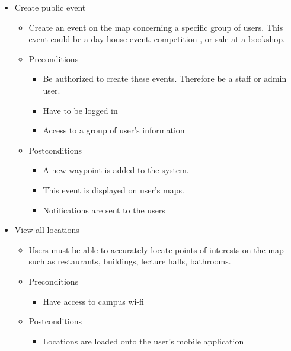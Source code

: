 \documentclass[12pt]{article}
\begin{document}
\begin{enumerate}
\begin{itemize}
				\item Create public event
				\begin{itemize}
					\item Create an event on the map concerning a specific group of users. This event could be a day house event. competition , or sale at a bookshop.
					\item Preconditions
					\begin{itemize}
						\item Be authorized to create these events. Therefore be a staff or admin user.
						\item Have to be logged in
						\item Access to a group of user’s information
					\end{itemize}
					\item Postconditions
					\begin{itemize}
						\item A new waypoint is added to the system.
						\item This event is displayed on user’s maps.
						\item Notifications are sent to the users
					\end{itemize}
				\end{itemize}
				
				\item View all locations
				\begin{itemize}
					\item Users must be able to accurately locate points of interests on the map such as restaurants, buildings, lecture halls, bathrooms.
					\item Preconditions
					\begin{itemize}
						\item Have access to campus wi-fi
					\end{itemize}
					\item Postconditions
					\begin{itemize}
						\item Locations are loaded onto the user’s mobile application
					\end{itemize}
				\end{itemize}
				

\end{itemize}
\end{enumerate}
\end{document}
